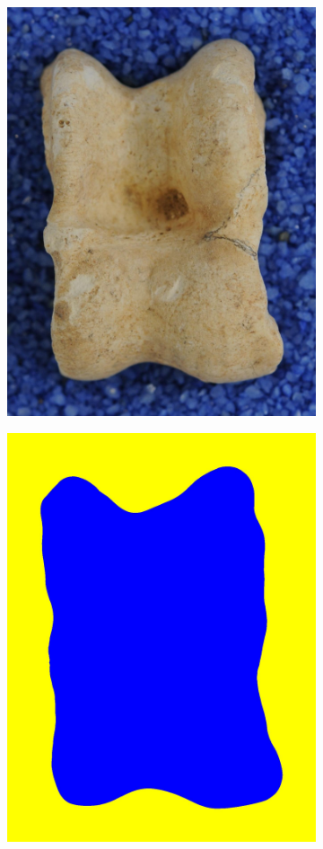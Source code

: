 \documentclass[pdftex,12pt,a4paper]{report}
\begin{document}
\begin{figure}[h]
	\centering
	\begin{subfigure}[b]{0.24\textwidth}
		\centering
		\includegraphics[width=.9\linewidth]{img/segmentation/good/watershed/cut.jpg}
		\subcaption{}
	\end{subfigure}
	\begin{subfigure}[b]{0.24\textwidth}
		\centering
		\includegraphics[width=.9\linewidth]{img/segmentation/good/watershed/segmented.jpg}

\end{subfigure}
\end{figure}
\end{document}
